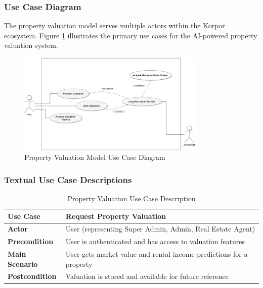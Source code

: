 \subsubsection{Use Case Diagram}
The property valuation model serves multiple actors within the Korpor ecosystem. Figure \ref{fig:valuation-use-case} illustrates the primary use cases for the AI-powered property valuation system.
\begin{figure}[htbp]
    \centering
    \includegraphics[width=0.8\textwidth]{images/valuation_use_case_diagram.png}
    \caption{Property Valuation Model Use Case Diagram}
    \label{fig:valuation-use-case}
\end{figure}

\subsubsection{Textual Use Case Descriptions}

\begin{table}[htbp]
    \centering
    \begin{tabular}{|p{3cm}|p{10cm}|}
        \hline
        \textbf{Use Case} & \textbf{Request Property Valuation} \\
        \hline
        \textbf{Actor} & User (representing Super Admin, Admin, Real Estate Agent) \\
        \hline
        \textbf{Precondition} & User is authenticated and has access to valuation features \\
        \hline
        \textbf{Main Scenario} & User gets market value and rental income predictions for a property \\
        \hline
        \textbf{Postcondition} & Valuation is stored and available for future reference \\
        \hline
    \end{tabular}
    \caption{Property Valuation Use Case Description}
    \label{tab:property-valuation-use-case}
\end{table}
\newpage
